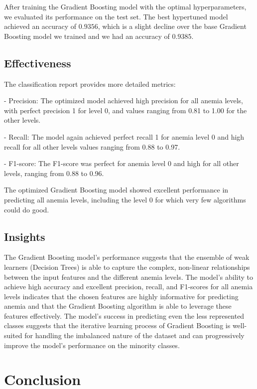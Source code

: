 After training the Gradient Boosting model with the optimal hyperparameters, we evaluated its performance on the test set. The best hypertuned model achieved an accuracy of $0.9356$, which is a slight decline over the base Gradient Boosting model we trained and we had an accuracy of $0.9385$.


\subsection{Effectiveness}


The classification report provides more detailed metrics:


- Precision: The optimized model achieved high precision for all anemia levels, with perfect precision 1 for level 0, and values ranging from 0.81 to 1.00 for the other levels.


- Recall: The model again achieved perfect recall 1 for anemia level 0 and high recall for all other levels values ranging from 0.88 to 0.97.


- F1-score: The F1-score was perfect for anemia level 0 and high for all other levels, ranging from 0.88 to 0.96.

The optimized Gradient Boosting model showed excellent performance in predicting all anemia levels, including the level 0 for which very few algorithms could do good.


\subsection{Insights}

The Gradient Boosting model's performance suggests that the ensemble of weak learners (Decision Trees) is able to capture the complex, non-linear relationships between the input features and the different anemia levels. The model's ability to achieve high accuracy and excellent precision, recall, and F1-scores for all anemia levels indicates that the chosen features are highly informative for predicting anemia and that the Gradient Boosting algorithm is able to leverage these features effectively. The model's success in predicting even the less represented classes suggests that the iterative learning process of Gradient Boosting is well-suited for handling the imbalanced nature of the dataset and can progressively improve the model's performance on the minority classes.


\section{Conclusion}

